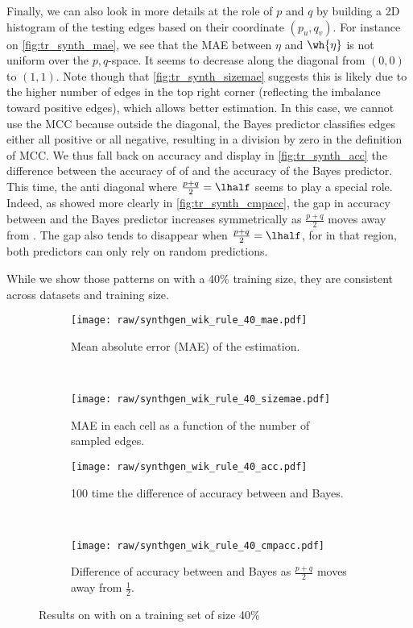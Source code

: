Finally, we can also look in more details at the role of $p$ and $q$ by building a 2D histogram of
the testing edges \euv{} based on their coordinate $(p_u, q_v)$. For instance on
\autoref{fig:tr_synth_mae}, we see that the MAE between $\eta$ and $\wh{\eta}$ is not uniform over
the $p,q$-space. It seems to decrease along the diagonal from $(0,0)$ to $(1,1)$. Note though that
\autoref{fig:tr_synth_sizemae} suggests this is likely due to the higher number of edges in the top
right corner (reflecting the imbalance toward positive edges), which allows better estimation. 
In this case, we cannot use the MCC because outside the diagonal, the Bayes predictor classifies edges
either all positive or all negative, resulting in a division by zero in the definition of MCC. We thus
fall back on accuracy and display in \autoref{fig:tr_synth_acc} the difference between the accuracy
of of \usrule{} and the accuracy of the Bayes predictor. This time, the anti diagonal where
$\frac{p+q}{2}=\lhalf$ seems to play a special role. Indeed, as showed more clearly in
\autoref{fig:tr_synth_cmpacc}, the gap in accuracy between \usrule{} and the Bayes predictor
increases symmetrically as $\frac{p+q}{2}$ moves away from \shalf{}. The gap also tends to disappear
when $\frac{p+q}{2}=\lhalf$, for in that region, both predictors can only rely on random predictions.

While we show those patterns on \wik{} with a 40\% training size, they are consistent across
datasets and training size.

\begin{figure*}[hbtp]
  \begin{subfigure}[b]{0.504\textwidth} 
    \texttt{[image: raw/synthgen\_wik\_rule\_40\_mae.pdf]} 
    \caption{Mean absolute error (MAE) of the \etauv{} estimation.} 
    \label{fig:tr_synth_mae}
  \end{subfigure}~
  \begin{subfigure}[b]{0.504\textwidth} 
    \texttt{[image: raw/synthgen\_wik\_rule\_40\_sizemae.pdf]} 
    \caption{MAE in each cell as a function of the number of sampled edges.} 
    \label{fig:tr_synth_sizemae}
  \end{subfigure}

  \begin{subfigure}[b]{0.504\textwidth} 
    \texttt{[image: raw/synthgen\_wik\_rule\_40\_acc.pdf]} 
    \caption{100 time the difference of accuracy between \usrule{} and Bayes.} 
    \label{fig:tr_synth_acc}
  \end{subfigure}~
  \begin{subfigure}[b]{0.504\textwidth} 
    \texttt{[image: raw/synthgen\_wik\_rule\_40\_cmpacc.pdf]} 
    \caption{Difference of accuracy between \usrule{} and Bayes as $\frac{p+q}{2}$ moves away from $\frac{1}{2}$.} 
    \label{fig:tr_synth_cmpacc}
  \end{subfigure}
  \caption{Results on \wik{} with \usrule{} on a training set of size 40\%}
\end{figure*}

